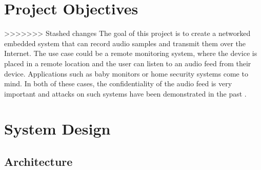 \documentclass[conference]{IEEEtran}
\begin{document}

\section{Project Objectives} %
\label{sec:background}

>>>>>>> Stashed changes
The goal of this project is to create a networked embedded system that can record audio samples and transmit them over the Internet.
The use case could be a remote monitoring system, where the device is placed in a remote location and 
the user can listen to an audio feed from their device. Applications such as baby monitors or home security systems come to mind.
In both of these cases, the confidentiality of the audio feed is very important and
attacks on such systems have been demonstrated in the past \cite{BabyMonitorHack, VideoSurvAttacks}.


\section{System Design}
\label{sec:system_design}

\subsection{Architecture}
\end{document}
